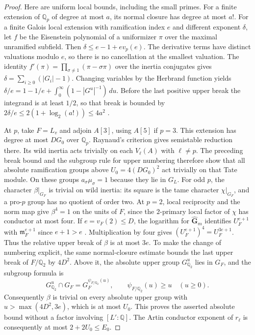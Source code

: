 \documentclass[11pt]{article}
\theoremstyle{definition}
\theoremstyle{remark}
\newcommand{\Q}{\mathbb Q}
\begin{document}
\begin{proof}
Here are uniform local bounds, including the small primes.
For a finite extension of $\Q_p$ of degree at most $a$, its
normal closure has degree at most $a!$. For a finite Galois
local extension with ramification index $e$ and different
exponent $\delta$, let $f$ be the Eisenstein polynomial of a
uniformizer $\pi$ over the maximal unramified subfield. Then
$\delta\le e-1+e v_p(e)$. The derivative terms have distinct
valuations modulo $e$, so there is no cancellation at the
smallest valuation. The identity
$f'(\pi)=\prod_{\sigma\ne1}(\pi-\sigma\pi)$ over the inertia
conjugates gives $\delta=\sum_{i\ge0}(|G_i|-1)$. Changing variables
by the Herbrand function yields
$\delta/e=1-1/e+\int_0^\infty(1-|G^u|^{-1})\,du$.
Before the last positive upper break the integrand is at least
$1/2$, so that break is bounded by
$2\delta/e\le2(1+\log_2(a!))\le4a^2$
\cite[Sections 4.1--4.3]{serrelocal}.

At $p$, take $F=L_v$ and adjoin $A[3]$, using $A[5]$ if
$p=3$. This extension has degree at most $DG_0$ over $\Q_p$.
Raynaud's criterion \cite[Theorem 3.5]{silverbergzarhin}
gives semistable reduction there. Its wild inertia acts
trivially on each $V_\ell(A)$ with $\ell\ne p$.
The preceding break bound and the subgroup rule for upper
numbering therefore show that all absolute ramification
groups above $U_0=4(DG_0)^2$ act trivially on that Tate module.
On these groups $a_\sigma\mu_\sigma=1$ because they lie in $G_L$.
For odd $p$, the character $\beta|_{G_F}$ is trivial on wild
inertia: its square is the tame character $\chi|_{G_F}$, and a
pro-$p$ group has no quotient of order two. At $p=2$, local
reciprocity and the norm map give $\beta^4=1$ on the units of
$F$, since the $2$-primary local factor of $\chi$ has conductor
at most four. If $e=v_F(2)\le D$, the logarithm for $\widehat{\mathbf G}_m$ identifies
$U_F^{e+1}$ with $\mathfrak m_F^{e+1}$ since $e+1>e$
\cite[IV.6.4, p.~132]{silverman}. Multiplication by four gives
$(U_F^{e+1})^4=U_F^{3e+1}$. Thus the relative upper break of
$\beta$ is at most $3e$. To make the change of numbering explicit,
the same normal-closure estimate bounds the last upper break of
$F/\mathbb Q_2$ by $4D^2$. Above it, the absolute upper group
$G_{\mathbb Q_2}^{u}$ lies in $G_F$, and the subgroup formula is
\[
 G_{\mathbb Q_2}^{u}\cap G_F
       =G_F^{\psi_{F/\mathbb Q_2}(u)},
 \qquad \psi_{F/\mathbb Q_2}(u)\ge u\quad(u\ge0).
\]
Consequently $\beta$ is trivial on every absolute upper group with
$u>\max(4D^2,3e)$, which is at most $U_0$.
This proves the asserted absolute bound without a factor involving
$[L':\mathbb Q]$.
The Artin conductor exponent of $r_\ell$ is consequently
at most $2+2U_0\le E_0$.


\end{proof}
\end{document}
